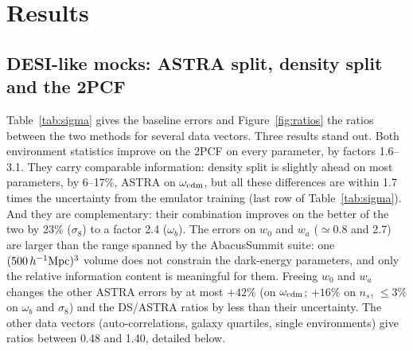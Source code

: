 \section{Results}
\label{sec:results}

\subsection{DESI-like mocks: ASTRA split, density split and the 2PCF}

Table~\ref{tab:sigma} gives the baseline errors and Figure~\ref{fig:ratios} the ratios between the two methods for several data vectors. Three results stand out. Both environment statistics improve on the 2PCF on every parameter, by factors 1.6--3.1. They carry comparable information: density split is slightly ahead on most parameters, by 6--17\%, ASTRA on $\omega_{\rm cdm}$, but all these differences are within 1.7 times the uncertainty from the emulator training (last row of Table~\ref{tab:sigma}). And they are complementary: their combination improves on the better of the two by 23\% ($\sigma_8$) to a factor 2.4 ($\omega_b$). The errors on $w_0$ and $w_a$ ($\simeq0.8$ and 2.7) are larger than the range spanned by the AbacusSummit suite: one $(500\,h^{-1}\mathrm{Mpc})^3$ volume does not constrain the dark-energy parameters, and only the relative information content is meaningful for them. Freeing $w_0$ and $w_a$ changes the other ASTRA errors by at most $+42\%$ (on $\omega_{\rm cdm}$; $+16\%$ on $n_s$, $\le3\%$ on $\omega_b$ and $\sigma_8$) and the DS/ASTRA ratios by less than their uncertainty. The other data vectors (auto-correlations, galaxy quartiles, single environments) give ratios between 0.48 and 1.40, detailed below.

